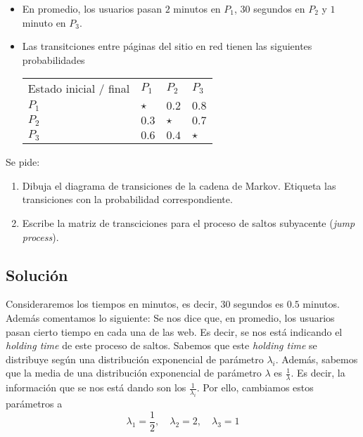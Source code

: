 \documentclass[a4paper]{article}
\begin{document}
\begin{itemize}
  \item En promedio, los usuarios pasan $2$ minutos en $P_{1}$, 30 segundos en $P_{2}$ y $1$ minuto en $P_{3}$.

  \item Las transitciones entre páginas del sitio en red tienen las siguientes probabilidades

  \begin{table}[H]
    \centering
\begin{tabular}{llll}
Estado inicial / final & $P_1$   & $P_2$   & $P_3$   \\
$P_1$                  & $\star$ & $0.2$   & $0.8$   \\
$P_2$                  & $0.3$   & $\star$ & $0.7$   \\
$P_3$                  & $0.6$   & $0.4$   & $\star$
\end{tabular}
\end{table}
\end{itemize}

Se pide:

\begin{enumerate}[label = (\alph*)]
  \item Dibuja el diagrama de transiciones de la cadena de Markov. Etiqueta las transiciones con la probabilidad correspondiente.

  \item Escribe la matriz de transciciones para el proceso de saltos subyacente (\emph{jump process}).




\end{enumerate}


\subsection*{Solución}

Consideraremos los tiempos en minutos, es decir, $30$ segundos es $0.5$ minutos.\\

Además comentamos lo siguiente: Se nos dice que, en promedio, los usuarios pasan cierto tiempo en cada una de las web. Es decir, se nos está indicando el \emph{holding time} de este proceso de saltos. Sabemos que este \emph{holding time} se distribuye según una distribución exponencial de parámetro $\lambda_{i}$. Además, sabemos que la media de una distribución exponencial de parámetro $\lambda$ es $\frac{1}{\lambda}$. Es decir, la información que se nos está dando son los $\frac{1}{\lambda_{i}}$. Por ello, cambiamos estos parámetros a
\[
\lambda_{1} = \frac{1}{2}, \quad \lambda_{2} = 2, \quad \lambda_{3} = 1
\]
\end{document}
